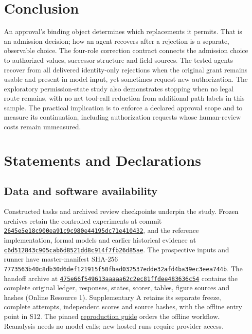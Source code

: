 \documentclass[pdflatex,sn-basic]{sn-jnl}
\begin{document}
\section{Conclusion}\label{conclusion}

An approval's binding object determines which replacements it permits. That is an admission decision; how an agent recovers after a rejection is a separate, observable choice. The four-role correction contract connects the admission choice to authorized values, successor structure and field sources. The tested agents recover from all delivered identity-only rejections when the original grant remains usable and present in model input, yet sometimes request new authorization. The exploratory permission-state study also demonstrates stopping when no legal route remains, with no net tool-call reduction from additional path labels in this sample. The practical implication is to enforce a declared approval scope and to measure its continuation, including authorization requests whose human-review costs remain unmeasured.
\section*{Statements and Declarations}
\subsection*{Data and software availability}
Constructed tasks and archived review checkpoints underpin the study. Frozen archives retain the controlled experiments at commit \href{https://github.com/lhh666-6/auto-dete/tree/2645e5e18c900ea91c9c980e44195dc71e410432/DKE-supplement}{\nolinkurl{2645e5e18c900ea91c9c980e44195dc71e410432}}, and the reference implementation, formal models and earlier historical evidence at \href{https://github.com/lhh666-6/auto-dete/tree/c6d512843c905cab6d8521dd8c914f7fb26d85ae/latest}{\nolinkurl{c6d512843c905cab6d8521dd8c914f7fb26d85ae}}. The prospective inputs and runner have master-manifest SHA-256 \nolinkurl{7773563b40c8db30d6def121915f50fbad032537edde32afd4ba39ec3eea744b}. The handoff archive at \href{https://github.com/lhh666-6/auto-dete/tree/475e66f549613aaaaa62c2ec81ffdee483636c54/cloud-handoff}{\nolinkurl{475e66f549613aaaaa62c2ec81ffdee483636c54}} contains the complete original ledger, responses, states, scorer, tables, figure sources and hashes (Online Resource 1). Supplementary A retains its separate freeze, complete attempts, independent scores and source hashes, with the offline entry point in S12. The pinned \href{https://github.com/lhh666-6/auto-dete/blob/f5fe7231c5e808ba1629132d222f448bff471204/REPRODUCIBILITY.md}{reproduction guide} orders the offline workflow. Reanalysis needs no model calls; new hosted runs require provider access.
\end{document}

